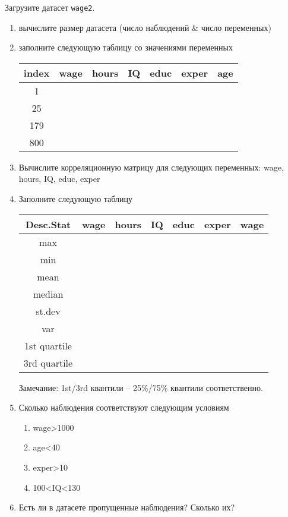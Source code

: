 \begin{exercise}
Загрузите датасет \texttt{wage2}.
\begin{enumerate}
	\item вычислите размер датасета (число наблюдений \& число переменных)
	\item заполните следующую таблицу со значениями переменных
	\begin{center}
		\begin{tabular}{|c|c|c|c|c|c|c|} \hline
			index & wage & hours& IQ & educ & exper & age \\ \hline\hline
			1 & & & & & & \\ \hline
			25 & & & &  & & \\ \hline
			179 & & & & & & \\ \hline
			800 & & & & & & \\ \hline
		\end{tabular}
	\end{center}
	\item Вычислите корреляционную матрицу для следующих переменных: wage, hours, IQ, educ, exper 
	\item Заполните следующую таблицу
	\begin{center}
		\begin{tabular}{|c|c|c|c|c|c|c|} \hline
			Desc.Stat & wage & hours& IQ & educ & exper & wage \\ \hline\hline
			max & & & & & & \\ \hline
			min & & & & & & \\ \hline
			mean & & & & & & \\ \hline
			median & & & & & & \\ \hline
			st.dev & & & & & & \\ \hline
			var & & & & & & \\ \hline
			1st quartile & & & & & & \\ \hline
			3rd quartile & & & & & & \\ \hline
		\end{tabular}
	\end{center}
	Замечание: 1st/3rd квантили -- 25\%/75\% квантили соответственно.
	\item Сколько наблюдения соответствуют следующим условиям
		\begin{enumerate}
			\item wage>1000
			\item age<40
			\item exper>10
			\item 100<IQ<130
		\end{enumerate}
	\item Есть ли в датасете пропущенные наблюдения?
	Сколько их?
\end{enumerate}
\end{exercise}

